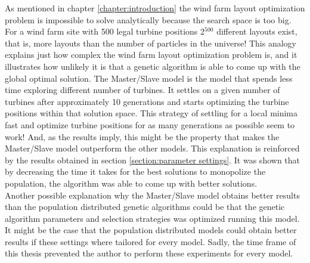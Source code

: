 \noindent As mentioned in chapter \ref{chapter:introduction} the wind farm layout optimization problem is impossible to solve analytically because the search space is too big. For a wind farm site with 500 legal turbine positions 2$^{500}$ different layouts exist, that is, more layouts than the number of particles in the universe! This analogy explains just how complex the wind farm layout optimization problem is, and it illustrates how unlikely it is that a genetic algorithm is able to come up with the global optimal solution. The Master/Slave model is the model that spends less time exploring different number of turbines. It settles on a given number of turbines after approximately 10 generations and starts optimizing the turbine positions within that solution space. This strategy of settling for a local minima fast and optimize turbine positions for as many generations as possible seem to work! And, as the results imply, this might be the property that makes the Master/Slave  model outperform the other models. This explanation is reinforced by the results obtained in section \ref{section:parameter settings}. It was shown that by decreasing the time it takes for the best solutions to monopolize the population, the algorithm was able to come up with better solutions.\\


\noindent Another possible explanation why the Master/Slave model obtains better results than the population distributed genetic algorithms could be that the genetic algorithm parameters and selection strategies was optimized running this model. It might be the case that the population distributed models could obtain better results if these settings where tailored for every model. Sadly, the time frame of this thesis prevented the author to perform these experiments for every model. \\


